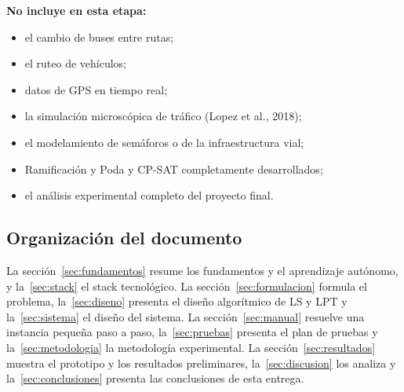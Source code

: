 \textbf{No incluye en esta etapa:}
\begin{itemize}
  \item el cambio de buses entre rutas;
  \item el ruteo de vehículos;
  \item datos de GPS en tiempo real;
  \item la simulación microscópica de tráfico (Lopez et al., 2018);
  \item el modelamiento de semáforos o de la infraestructura vial;
  \item Ramificación y Poda y CP-SAT completamente desarrollados;
  \item el análisis experimental completo del proyecto final.
\end{itemize}

\subsection{Organización del documento}
La sección~\ref{sec:fundamentos} resume los fundamentos y el aprendizaje autónomo, y la~\ref{sec:stack} el stack tecnológico. La sección~\ref{sec:formulacion} formula el problema, la~\ref{sec:diseno} presenta el diseño algorítmico de LS y LPT y la~\ref{sec:sistema} el diseño del sistema. La sección~\ref{sec:manual} resuelve una instancia pequeña paso a paso, la~\ref{sec:pruebas} presenta el plan de pruebas y la~\ref{sec:metodologia} la metodología experimental. La sección~\ref{sec:resultados} muestra el prototipo y los resultados preliminares, la~\ref{sec:discusion} los analiza y la~\ref{sec:conclusiones} presenta las conclusiones de esta entrega.
